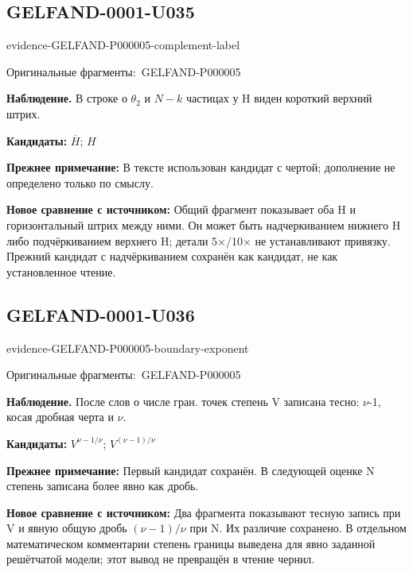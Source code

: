 \documentclass[11pt]{article}
\newcommand{\EvidenceBlock}[4]{%
 \par\smallskip\noindent\begin{minipage}{\linewidth}
 \begin{minipage}[t]{.47\linewidth}\vspace{0pt}\centering
 \csname evidence-#1-#2\endcsname\par
 {\scriptsize\SourceCropCaption\ #1}\par
 \end{minipage}\hfill
 \begin{minipage}[t]{.49\linewidth}\vspace{0pt}\raggedright
 {\small\color{orange!65!black}\textbf{#4} #3}\par
 \end{minipage}
 \end{minipage}\par\smallskip}
\newcommand{\SourceCropCaption}{Оригинальные фрагменты:}\newcommand{\ReadingCaption}{Сомнительное чтение.}\newcommand{\IncompleteCaption}{Неразобранный фрагмент.}\newcommand{\DiagramCaption}{Рисунок и набранное описание.}
\begin{document}
\subsection*{GELFAND-0001-U035}
\EvidenceBlock{GELFAND-P000005}{complement-label}{В строке о \(\theta_2\) и \(N-k\) частицах у H виден короткий верхний штрих.}{Наблюдение.}
\par\smallskip\noindent\textbf{Кандидаты: } \(\overline H\); \(H\)\par
\par\smallskip\noindent\textbf{Прежнее примечание: } В тексте использован кандидат с чертой; дополнение не определено только по смыслу.\par
\par\smallskip\noindent\textbf{Новое сравнение с источником: } Общий фрагмент показывает оба H и горизонтальный штрих между ними. Он может быть надчеркиванием нижнего H либо подчёркиванием верхнего H; детали 5×/10× не устанавливают привязку. Прежний кандидат с надчёркиванием сохранён как кандидат, не как установленное чтение.\par

\subsection*{GELFAND-0001-U036}
\EvidenceBlock{GELFAND-P000005}{boundary-exponent}{После слов о числе гран. точек степень V записана тесно: \(\nu\)-1, косая дробная черта и \(\nu\).}{Наблюдение.}
\par\smallskip\noindent\textbf{Кандидаты: } \(V^{\nu-1/\nu}\); \(V^{(\nu-1)/\nu}\)\par
\par\smallskip\noindent\textbf{Прежнее примечание: } Первый кандидат сохранён. В следующей оценке N степень записана более явно как дробь.\par
\par\smallskip\noindent\textbf{Новое сравнение с источником: } Два фрагмента показывают тесную запись при V и явную общую дробь \((\nu-1)/\nu\) при N. Их различие сохранено. В отдельном математическом комментарии степень границы выведена для явно заданной решётчатой модели; этот вывод не превращён в чтение чернил.\par
\end{document}
